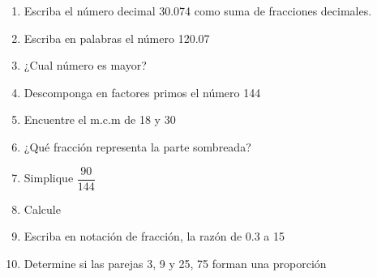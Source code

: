 \documentclass[10pt,twoside]{article}
\begin{document}
\begin{enumerate}
\begin{enumerate}
\end{enumerate}
\item Escriba el número decimal 30.074 como suma de fracciones decimales.
\item Escriba en palabras el número 120.07
\newpage
\item ¿Cual número es mayor?
\begin{enumerate}
\end{enumerate}
\item Descomponga en factores primos el número 144
\item Encuentre el m.c.m de 18 y 30
\item ¿Qué fracción representa la parte sombreada? 
\item Simplique $\dfrac{90}{144}$
\item Calcule
\begin{enumerate}
\end{enumerate}
\item Escriba en notación de fracción, la razón de 0.3 a 15
\item Determine si las parejas 3, 9 y 25, 75 forman una proporción

\end{enumerate}
\end{document}
